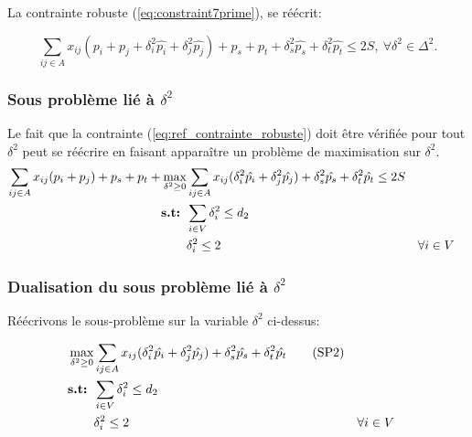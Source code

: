 \documentclass{article}
\begin{document}
La contrainte robuste (\ref{eq:constraint7prime}), se réécrit:

\begin{equation}
\label{eq:ref_contrainte_robuste}
  \sum_{ij \in A} x_{ij}(p_i + p_j + \delta_{i}^{2} \hat{p_i} + \delta_{j}^{2} \hat{p_j}) + p_s + p_t + \delta_{s}^{2} \hat{p_s} + \delta_{t}^{2} \hat{p_t} \leq 2S,\ \forall \delta^{2} \in \Delta^{2}.
\end{equation}


\subsubsection{Sous problème lié à $\delta^{2}$}

Le fait que la contrainte (\ref{eq:ref_contrainte_robuste}) doit être vérifiée pour tout $\delta^{2}$ peut se réécrire en faisant apparaître un problème de maximisation sur $\delta^{2}$.
\begin{align}
  \sum_{ij \in A} x_{ij} (p_i + p_j) + p_s + p_t + 
    \max_{\delta^{2} \geq 0} & \sum_{ij \in A} x_{ij}(\delta^{2}_{i} \hat{p_i} + \delta^{2}_{j} \hat{p_j}) + \delta^{2}_{s} \hat{p_s} + \delta^{2}_{t} \hat{p_t} \leq 2S \\
     \textbf{s.t: } & \sum_{i \in V} \delta^{2}_{i} \leq d_2 \notag \\
     & \delta^{2}_{i} \leq 2 && \forall i \in V \notag
\end{align}


\subsubsection{Dualisation du sous problème lié à $\delta^{2}$}

Réécrivons le sous-problème sur la variable $\delta^{2}$ ci-dessus:

\begin{align}
    \max_{\delta^{2} \geq 0} & \sum_{ij \in A} x_{ij}(\delta^{2}_{i} \hat{p_i} + \delta^{2}_{j} \hat{p_j}) + \delta^{2}_{s} \hat{p_s} + \delta^{2}_{t} \hat{p_t} \tag{SP2} \label{eq:sous-prob-2}\\
     \textbf{s.t: } & \sum_{i \in V} \delta^{2}_{i} \leq d_2 \notag \\
     & \delta^{2}_{i} \leq 2 && \forall i \in V \notag
\end{align}
\end{document}

